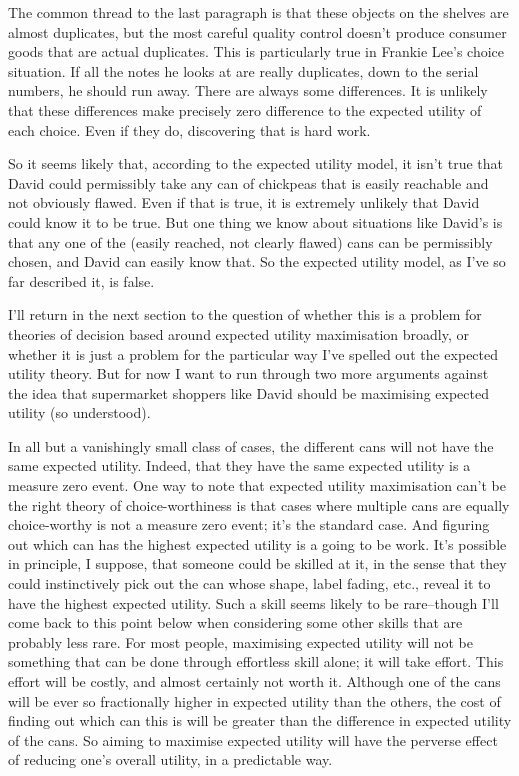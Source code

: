 \documentclass[
  10pt,
  letterpaper,
  twoside]{scrbook}
\begin{document}
The common thread to the last paragraph is that these objects on the
shelves are almost duplicates, but the most careful quality control
doesn't produce consumer goods that are actual duplicates. This is
particularly true in Frankie Lee's choice situation. If all the notes he
looks at are really duplicates, down to the serial numbers, he should
run away. There are always some differences. It is unlikely that these
differences make precisely zero difference to the expected utility of
each choice. Even if they do, discovering that is hard work.

So it seems likely that, according to the expected utility model, it
isn't true that David could permissibly take any can of chickpeas that
is easily reachable and not obviously flawed. Even if that is true, it
is extremely unlikely that David could know it to be true. But one thing
we know about situations like David's is that any one of the (easily
reached, not clearly flawed) cans can be permissibly chosen, and David
can easily know that. So the expected utility model, as I've so far
described it, is false.

I'll return in the next section to the question of whether this is a
problem for theories of decision based around expected utility
maximisation broadly, or whether it is just a problem for the particular
way I've spelled out the expected utility theory. But for now I want to
run through two more arguments against the idea that supermarket
shoppers like David should be maximising expected utility (so
understood).

In all but a vanishingly small class of cases, the different cans will
not have the same expected utility. Indeed, that they have the same
expected utility is a measure zero event. One way to note that expected
utility maximisation can't be the right theory of choice-worthiness is
that cases where multiple cans are equally choice-worthy is not a
measure zero event; it's the standard case. And figuring out which can
has the highest expected utility is a going to be work. It's possible in
principle, I suppose, that someone could be skilled at it, in the sense
that they could instinctively pick out the can whose shape, label
fading, etc., reveal it to have the highest expected utility. Such a
skill seems likely to be rare--though I'll come back to this point below
when considering some other skills that are probably less rare. For most
people, maximising expected utility will not be something that can be
done through effortless skill alone; it will take effort. This effort
will be costly, and almost certainly not worth it. Although one of the
cans will be ever so fractionally higher in expected utility than the
others, the cost of finding out which can this is will be greater than
the difference in expected utility of the cans. So aiming to maximise
expected utility will have the perverse effect of reducing one's overall
utility, in a predictable way.
\end{document}
